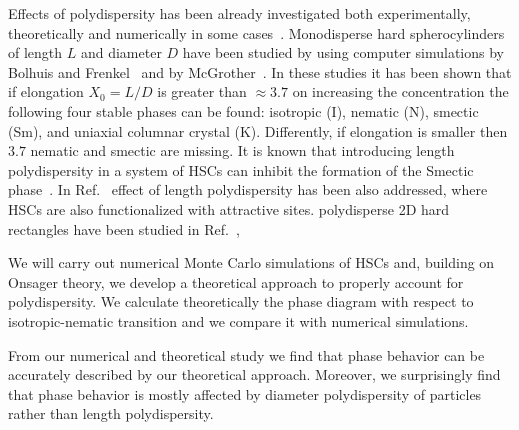 \documentclass[journal=jacsat,manuscript=article]{achemso}
\begin{document}
Effects of polydispersity has been already investigated both experimentally, theoretically 
and numerically in some cases~\cite{Woolston2015}. 
Monodisperse hard spherocylinders of length $L$ and diameter $D$ have been studied by
using computer simulations by Bolhuis and Frenkel~\cite{Bolhuis1997} and by McGrother~\cite{McGrother96}.
In these studies it has been shown that if elongation $X_0=L/D$ is greater than $\approx 3.7$ 
on increasing the concentration the following four stable phases can be found: isotropic (I), nematic (N), 
smectic (Sm), and uniaxial columnar crystal (K). Differently, if elongation is smaller then $3.7$ nematic and smectic 
are missing. It is known that introducing length polydispersity in a system of HSCs can inhibit the formation of 
the Smectic phase~\cite{Bates1998}. In Ref.~\cite{Millet2021} effect of length polydispersity has been also addressed, 
where HSCs are also functionalized with attractive sites.  
polydisperse 2D hard rectangles have been studied in Ref.~\cite{Armas2017},   

We will carry out numerical Monte Carlo simulations of HSCs and, building on Onsager theory, we develop a
theoretical approach to properly account for polydispersity. We calculate theoretically the phase diagram
with respect to isotropic-nematic transition and we compare it with numerical simulations.

From our numerical and theoretical study we find that phase behavior can be accurately described by our theoretical approach.
Moreover, we surprisingly find that phase behavior is mostly affected by diameter polydispersity of particles
rather than length polydispersity. 


\end{document}
